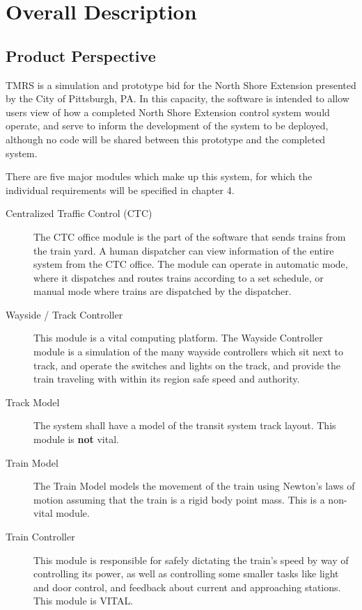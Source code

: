 \documentclass{scrreprt}
\begin{document}

\chapter{Overall Description}

\section{Product Perspective}
TMRS is a simulation and prototype bid for the North Shore Extension presented by the City of Pittsburgh, PA.
In this capacity, the software is intended to allow users view of how a completed North Shore Extension control system would operate, and serve to inform the development of the system to be deployed, although no code will be shared between this prototype and the completed system.

There are five major modules which make up this system, for which the individual requirements will be specified in chapter 4.

\begin{description}
    \item[Centralized Traffic Control (CTC)] The CTC office module is the part of the software that sends trains from the train yard.
    A human dispatcher can view information of the entire system from the CTC office.
    The module can operate in automatic mode, where it dispatches and routes trains according to a set schedule, or manual mode where trains are dispatched by the dispatcher.
    \item[Wayside / Track Controller] This module is a vital computing platform.
    The Wayside Controller module is a simulation of the many wayside controllers which sit next to track, and operate the switches and lights on the track, and provide the train traveling with within its region safe speed and authority.
    \item[Track Model] The system shall have a model of the transit system track layout. This module is \textbf{not} vital.
    \item[Train Model] The Train Model models the movement of the train using Newton's laws of motion
    assuming that the train is a rigid body point mass. This is a non-vital module.
    \item[Train Controller] This module is responsible for safely dictating the train's speed by way of controlling its power, as well as controlling some smaller tasks like light and door control, and feedback about current and approaching stations. This module is VITAL.
\end{description}
\end{document}
